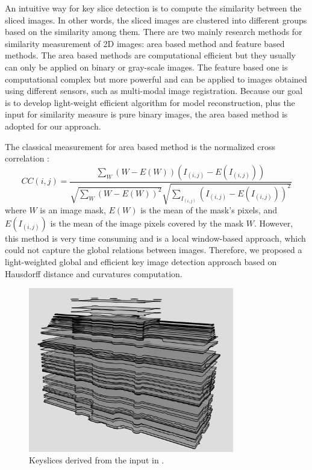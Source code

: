 An intuitive way for key slice detection is to 
compute the similarity between the sliced images.
In other words, the sliced images are clustered into different groups 
based on the similarity among them.
There are two mainly research methods for similarity measurement of 2D images: 
area based method and feature based methods. 
The area based methods are computational efficient 
but they usually can only be applied on binary or gray-scale images. 
The feature based one is computational complex but more powerful 
and can be applied to images obtained using different sensors, 
such as multi-modal image registration.
Because our goal is to develop light-weight efficient algorithm for model reconstruction, 
plus the input for similarity measure is pure binary images, 
the area based method is adopted for our approach.

The classical measurement for area based method is the normalized cross
correlation \cite{DIP_Pratt}:
\begin{equation*}
CC(i,j) = \frac{\sum_W(W - E(W))(I_{(i,j)}-E(I_{(i,j)}))}
{\sqrt{\sum_W(W - E(W))^2}\sqrt{\sum_{I_{(i,j)}}(I_{(i,j)} - E(I_{(i,j)}))^2}}
\end{equation*}
where $W$ is an image mask, $E(W)$ is the mean of the mask's pixels, 
and $E(I_{(i,j)})$ is the mean of the image pixels covered by the mask $W$.
However, this method is very time consuming and is a local window-based approach,
which could not capture the global relations between images. 
Therefore, we proposed a light-weighted global and efficient key image detection approach 
based on Hausdorff distance and curvatures computation.

\begin{figure}[hbtp]
\centering
\includegraphics[width=0.8\textwidth]{figures/keyslice_wireframe.png}
\caption{Keyslices derived from the input in .}
\label{fig:keyslices}
\end{figure}

